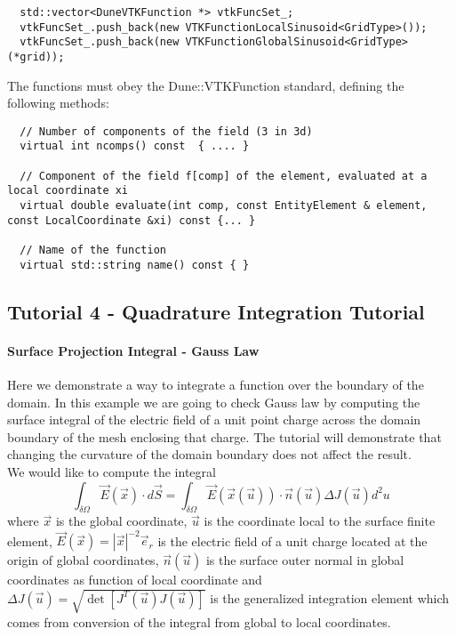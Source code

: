 \begin{mybox}
\begin{lstlisting}    
  std::vector<DuneVTKFunction *> vtkFuncSet_;
  vtkFuncSet_.push_back(new VTKFunctionLocalSinusoid<GridType>());
  vtkFuncSet_.push_back(new VTKFunctionGlobalSinusoid<GridType>(*grid));
\end{lstlisting}
\end{mybox}
	
\noindent
The functions must obey the Dune::VTKFunction standard, defining the following methods: \\

\begin{mybox}
\begin{lstlisting}    
  // Number of components of the field (3 in 3d)
  virtual int ncomps() const  { .... }
  
  // Component of the field f[comp] of the element, evaluated at a local coordinate xi
  virtual double evaluate(int comp, const EntityElement & element, const LocalCoordinate &xi) const {... }
  
  // Name of the function
  virtual std::string name() const { }
\end{lstlisting}
\end{mybox}



\subsection{Tutorial 4 - Quadrature Integration Tutorial}
\label{usage-howto-tutorial-integration-quadrature}

\paragraph{Surface Projection Integral - Gauss Law}
Here we demonstrate a way to integrate a function over the boundary of the domain. In this example we are going to check Gauss law by computing the surface integral of the electric field of a unit point charge across the domain boundary of the mesh enclosing that charge. The tutorial will demonstrate that changing the curvature of the domain boundary does not affect the result. \\

\noindent
We would like to compute the integral
\[\int_{\delta \Omega} \vec{E}(\vec{x}) \cdot d\vec{S} = \int_{\delta \Omega} \vec{E}(\vec{x}(\vec{u})) \cdot \vec{n}(\vec{u}) \Delta J(\vec{u}) d^2 u \]
\noindent
where $\vec{x}$ is the global coordinate, $\vec{u}$ is the coordinate local to the surface finite element, $\vec{E}(\vec{x}) = |\vec{x}|^{-2} \vec{e}_r$ is the electric field of a unit charge located at the origin of global coordinates, $\vec{n}(\vec{u})$ is the surface outer normal in global coordinates as function of local coordinate and $\Delta J(\vec{u}) = \sqrt{\det [ J^T(\vec{u}) J(\vec{u}) ]}$ is the generalized integration element which comes from conversion of the integral from global to local coordinates. \\


